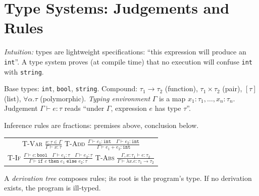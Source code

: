 \section{Type Systems: Judgements and Rules}
\label{sec:types}
\emph{Intuition:} types are lightweight specifications: ``this expression will produce an \texttt{int}''. A type system proves (at compile time) that no execution will confuse \texttt{int} with \texttt{string}.

\begin{definition}
Base types: \texttt{int}, \texttt{bool}, \texttt{string}. Compound: $\tau_1\to\tau_2$ (function), $\tau_1\times\tau_2$ (pair), $[\tau]$ (list), $\forall\alpha.\tau$ (polymorphic). \emph{Typing environment} $\Gamma$ is a map $x_1:\tau_1,\dots,x_n:\tau_n$. Judgement $\Gamma\vdash e:\tau$ reads ``under $\Gamma$, expression $e$ has type $\tau$''.
\end{definition}

Inference rules are fractions: premises above, conclusion below.
\begin{center}
\begin{tabular}{c}
\textsc{T-Var} $\displaystyle\frac{x:\tau\in\Gamma}{\Gamma\vdash x:\tau}$\quad
\textsc{T-Add} $\displaystyle\frac{\Gamma\vdash e_1:\texttt{int}\quad\Gamma\vdash e_2:\texttt{int}}{\Gamma\vdash e_1+e_2:\texttt{int}}$\\[1.2em]
\textsc{T-If} $\displaystyle\frac{\Gamma\vdash c:\texttt{bool}\quad\Gamma\vdash e_1:\tau\quad\Gamma\vdash e_2:\tau}{\Gamma\vdash \texttt{if }c\texttt{ then }e_1\texttt{ else }e_2:\tau}$\quad
\textsc{T-Abs} $\displaystyle\frac{\Gamma,x:\tau_1\vdash e:\tau_2}{\Gamma\vdash \lambda x.e:\tau_1\to\tau_2}$
\end{tabular}
\end{center}
A \emph{derivation tree} composes rules; its root is the program's type. If no derivation exists, the program is ill-typed.

